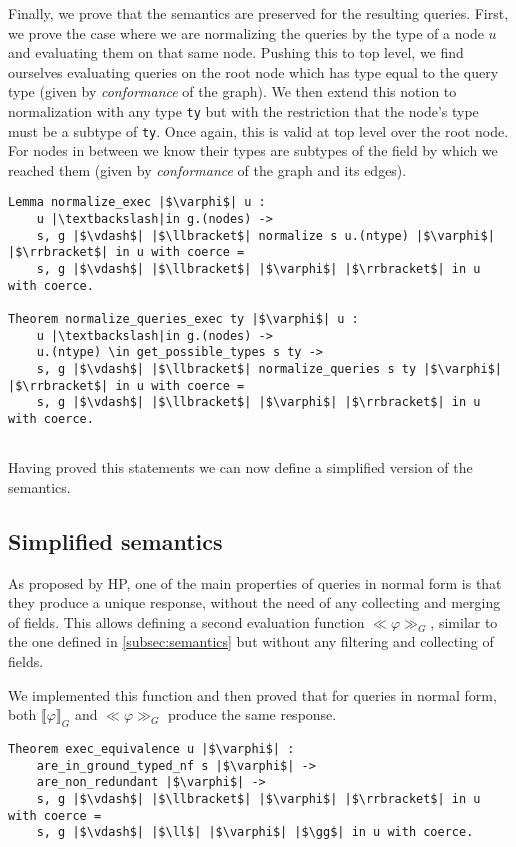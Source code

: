 Finally, we prove that the semantics are preserved for the resulting queries. First, we prove the case where we are normalizing the queries by the type of a node $u$ and evaluating them on that same node. Pushing this to top level, we find ourselves evaluating queries on the root node which has type equal to the query type (given by \textit{conformance} of the graph). We then extend this notion to normalization with any type \texttt{ty} but with the restriction that the node's type must be a subtype of \texttt{ty}. Once again, this is valid at top level over the root node. For nodes in between we know their types are subtypes of the field by which we reached them (given by \textit{conformance} of the graph and its edges).

\begin{verbatim}
Lemma normalize_exec |$\varphi$| u :
    u |\textbackslash|in g.(nodes) ->
    s, g |$\vdash$| |$\llbracket$| normalize s u.(ntype) |$\varphi$| |$\rrbracket$| in u with coerce = 
    s, g |$\vdash$| |$\llbracket$| |$\varphi$| |$\rrbracket$| in u with coerce. 
          
Theorem normalize_queries_exec ty |$\varphi$| u :
    u |\textbackslash|in g.(nodes) ->
    u.(ntype) \in get_possible_types s ty ->
    s, g |$\vdash$| |$\llbracket$| normalize_queries s ty |$\varphi$| |$\rrbracket$| in u with coerce =
    s, g |$\vdash$| |$\llbracket$| |$\varphi$| |$\rrbracket$| in u with coerce. 
 
\end{verbatim}

Having proved this statements we can now define a simplified version of the semantics.

\subsection{Simplified semantics}

As proposed by HP, one of the main properties of queries in normal form is that they produce a unique response, without the need of any collecting and merging of fields. This allows defining a second evaluation function $\ll \varphi \gg_{G}$, similar to the one defined in \ref{subsec:semantics} but without any filtering and collecting of fields. 

We implemented this function and then proved that for queries in normal form, both $\llbracket \varphi \rrbracket_{G}$ and $\ll \varphi \gg_{G}$ produce the same response.

\begin{verbatim}
Theorem exec_equivalence u |$\varphi$| :
    are_in_ground_typed_nf s |$\varphi$| ->
    are_non_redundant |$\varphi$| -> 
    s, g |$\vdash$| |$\llbracket$| |$\varphi$| |$\rrbracket$| in u with coerce = 
    s, g |$\vdash$| |$\ll$| |$\varphi$| |$\gg$| in u with coerce.
\end{verbatim}

